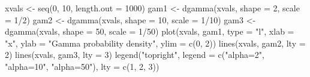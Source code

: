 \begin{Schunk}
\begin{Sinput}
 xvals <- seq(0, 10, length.out = 1000)
 gam1 <- dgamma(xvals, shape = 2, scale = 1/2)
 gam2 <- dgamma(xvals, shape = 10, scale = 1/10)
 gam3 <- dgamma(xvals, shape = 50, scale = 1/50)
 plot(xvals, gam1, type = "l", xlab = "x", ylab = "Gamma probability density", 
      ylim = c(0, 2))
 lines(xvals, gam2, lty = 2)
 lines(xvals, gam3, lty = 3)
 legend("topright", legend = c("alpha=2", "alpha=10", "alpha=50"), lty = c(1, 
      2, 3))
\end{Sinput}
\end{Schunk}
